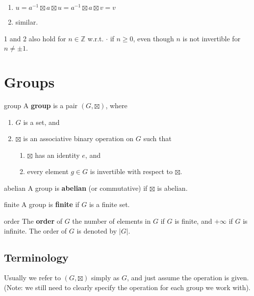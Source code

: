 \begin{pf}
\begin{enumerate}
\item $u=a^{-1}\boxtimes a \boxtimes u = a^{-1}\boxtimes a\boxtimes v = v$
\item similar.
\end{enumerate}
\end{pf}

1 and 2 also hold for $n\in\mathbb Z$ w.r.t. $\cdot$ if $n\ge 0$, even though $n$ is not invertible for $n\ne \pm 1$.

\section{Groups}
\begin{defn}{group}
A \textbf{group} is a pair $(G,\boxtimes)$, where
\begin{enumerate}
	\item $G$ is a set, and
	\item $\boxtimes$ is an associative binary operation on $G$ such that 
	\begin{enumerate}
		\item $\boxtimes$ has an identity $e$, and 
		\item every element $g\in G$ is invertible with respect to $\boxtimes$. 
	\end{enumerate}
\end{enumerate}
\end{defn}

\begin{defn}{abelian}
A group is \textbf{abelian} (or commutative) if $\boxtimes$ is abelian.
\end{defn}

\begin{defn}{finite}
A group is \textbf{finite} if $G$ is a finite set. 
\end{defn}

\begin{defn}{order}
The \textbf{order} of $G$ the number of elements in $G$ if $G$ is finite, and $+\infty$ if $G$ is infinite.
The order of $G$ is denoted by $|G|$.
\end{defn}

\subsection{Terminology}
Usually we refer to $(G,\boxtimes)$ simply as $G$, and just assume the operation is given. (Note: we still need to clearly specify the operation for each group we work with).

